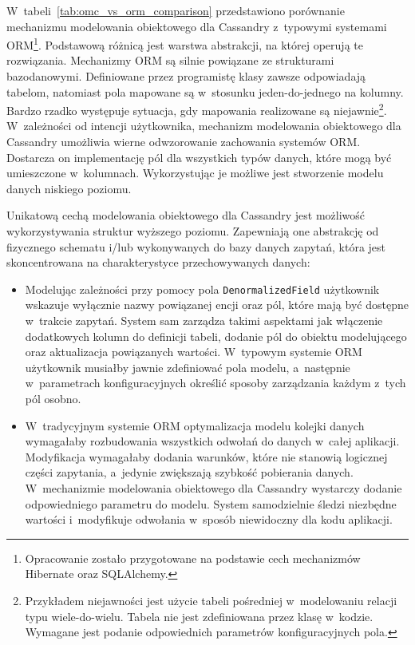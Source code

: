 W~tabeli~\ref{tab:omc_vs_orm_comparison} przedstawiono porównanie mechanizmu modelowania obiektowego dla Cassandry z~typowymi systemami ORM\footnote{Opracowanie zostało przygotowane na podstawie cech mechanizmów Hibernate oraz SQLAlchemy.}. Podstawową różnicą jest warstwa abstrakcji, na której operują te rozwiązania. Mechanizmy ORM są silnie powiązane ze strukturami bazodanowymi. Definiowane przez programistę klasy zawsze odpowiadają tabelom, natomiast pola mapowane są w~stosunku jeden-do-jednego na kolumny. Bardzo rzadko występuje sytuacja, gdy mapowania realizowane są niejawnie\footnote{Przykładem niejawności jest użycie tabeli pośredniej w~modelowaniu relacji typu wiele-do-wielu. Tabela nie jest zdefiniowana przez klasę w~kodzie. Wymagane jest podanie odpowiednich parametrów konfiguracyjnych pola.}. W~zależności od intencji użytkownika, mechanizm modelowania obiektowego dla Cassandry umożliwia wierne odwzorowanie zachowania systemów ORM. Dostarcza on implementację pól dla wszystkich typów danych, które mogą być umieszczone w~kolumnach. Wykorzystując je możliwe jest stworzenie modelu danych niskiego poziomu.  

Unikatową cechą modelowania obiektowego dla Cassandry jest możliwość wykorzystywania struktur wyższego poziomu. Zapewniają one abstrakcję od fizycznego schematu i/lub wykonywanych do bazy danych zapytań, która jest skoncentrowana na charakterystyce przechowywanych danych:

\begin{itemize}
	\item Modelując zależności przy pomocy pola \verb+DenormalizedField+ użytkownik wskazuje wyłącznie nazwy powiązanej encji oraz pól, które mają być dostępne w~trakcie zapytań. System sam zarządza takimi aspektami jak włączenie dodatkowych kolumn do definicji tabeli, dodanie pól do obiektu modelującego oraz aktualizacja powiązanych wartości. W~typowym systemie ORM użytkownik musiałby jawnie zdefiniować pola modelu, a~następnie w~parametrach konfiguracyjnych określić sposoby zarządzania każdym z~tych pól osobno.
	\item W~tradycyjnym systemie ORM optymalizacja modelu kolejki danych wymagałaby rozbudowania wszystkich odwołań do danych w~całej aplikacji. Modyfikacja wymagałaby dodania warunków, które nie stanowią logicznej części zapytania, a~jedynie zwiększają szybkość pobierania danych. W~mechanizmie modelowania obiektowego dla Cassandry wystarczy dodanie odpowiedniego parametru do modelu. System samodzielnie śledzi niezbędne wartości i~modyfikuje odwołania w~sposób niewidoczny dla kodu aplikacji.
\end{itemize}

